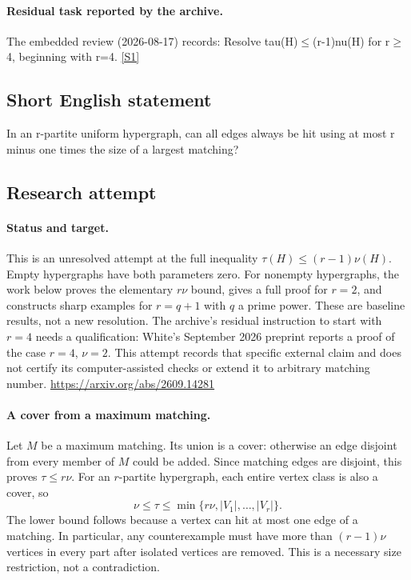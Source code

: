 \documentclass[11pt,a4paper]{article}
\newcommand{\sref}[2]{\hyperlink{source:#1:#2}{[S#2]}}
\begin{document}
\paragraph{Residual task reported by the archive.}

The embedded review (2026-08-17) records: Resolve tau(H)\ensuremath{≤}(r-1)nu(H) for r\ensuremath{≥}4, beginning with r=4. \sref{1440}{1}

\subsection{Short English statement}

In an r-partite uniform hypergraph, can all edges always be hit using at most r minus one times the size of a largest matching?

\subsection{Research attempt}
\paragraph{Status and target.}
This is an unresolved attempt at the full inequality
$\tau(H)\leq(r-1)\nu(H)$. Empty hypergraphs have both parameters zero.
For nonempty hypergraphs, the work below proves the elementary $r\nu$
bound, gives a full proof for $r=2$, and constructs sharp examples for
$r=q+1$ with $q$ a prime power. These are baseline results, not a new
resolution. The archive's residual instruction to start with $r=4$
needs a qualification: White's September 2026 preprint reports a proof
of the case $r=4$, $\nu=2$. This attempt records that specific external
claim and does not certify its computer-assisted checks or extend it to
arbitrary matching number. \url{https://arxiv.org/abs/2609.14281}

\paragraph{A cover from a maximum matching.}
Let $M$ be a maximum matching. Its union is a cover: otherwise an edge
disjoint from every member of $M$ could be added. Since matching edges
are disjoint, this proves $\tau\leq r\nu$. For an $r$-partite hypergraph,
each entire vertex class is also a cover, so
\[
 \nu\leq\tau\leq\min\{r\nu,|V_1|,\ldots,|V_r|\}.
\]
The lower bound follows because a vertex can hit at most one edge of a
matching. In particular, any counterexample must have more than
$(r-1)\nu$ vertices in every part after isolated vertices are removed.
This is a necessary size restriction, not a contradiction.
\end{document}
